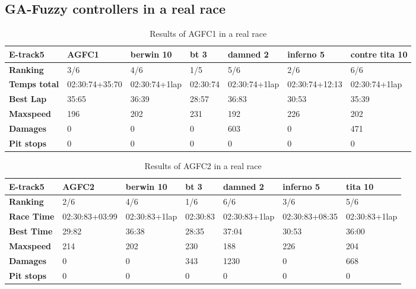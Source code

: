 \documentclass[runningheads,a4paper]{llncs}
\begin{document}
\subsection{GA-Fuzzy controllers in a real race}
\begin{table}[!h]
	\caption{Results of AGFC1 in a real race}
	\label{14}
	\begin{tabular}{|p{2.3cm}|p{1.75 cm}|p{1.75 cm}|p{1.75 cm}|p{1.75 cm}|p{1.75 cm}|p{1.75 cm}|}
		\hline \textbf{E-track5} &   \textbf{AGFC1} & \textbf{berwin 10} & \textbf{bt 3} &\textbf{damned 2} & \textbf{inferno 5} & \textbf{contre tita 10}  \\
		\hline \textbf{Ranking} & 3/6&4/6&1/5&5/6&2/6&6/6\\			
		\hline \textbf{Temps total}	& 02:30:74\newline+35:70&02:30:74\newline+1lap&02:30:74&02:30:74\newline+1lap&02:30:74\newline+12:13&02:30:74\newline+1lap\\	
		\hline \textbf{Best Lap}&35:65& 36:39&28:57&36:83&30:53&35:39\\	
		\hline \textbf{Maxspeed}& 196&202&231&192&226&202\\	
		\hline \textbf{Damages}& 0&0&0&603&0&471 \\	
		\hline \textbf{Pit stops} & 0&0&0&0&0&0\\	 
		\hline 
	\end{tabular}
\end{table}
\begin{table}[!h]
	\caption{Results of AGFC2 in a real race }
	\label{15}
	\begin{tabular}{|p{2.3cm}|p{1.75 cm}|p{1.75 cm}|p{1.75 cm}|p{1.75 cm}|p{1.75 cm}|p{1.75 cm}|}
		\hline \textbf{E-track5} & \textbf{AGFC2}&\textbf{berwin 10} & \textbf{bt 3} &\textbf{damned 2} & \textbf{inferno 5} & \textbf{tita 10}  \\
		\hline \textbf{Ranking} & 2/6&4/6&1/6&6/6&3/6&5/6\\			
		\hline \textbf{Race Time}	& 02:30:83\newline +03:99&  02:30:83\newline+1lap&02:30:83&02:30:83\newline+1lap&02:30:83\newline+08:35&02:30:83\newline+1lap\\	
		\hline \textbf{Best Time}& 29:82 &36:38&28:35&37:04&30:53&36:00\\	
		\hline \textbf{Maxspeed}& 214&202&230&188&226&204\\	
		\hline \textbf{Damages}& 0& 0 & 343&1230&0&668\\	
		\hline \textbf{Pit stops} &0&0&0&0&0&0 \\ 
		\hline 
	\end{tabular}
\end{table}
\end{document}
